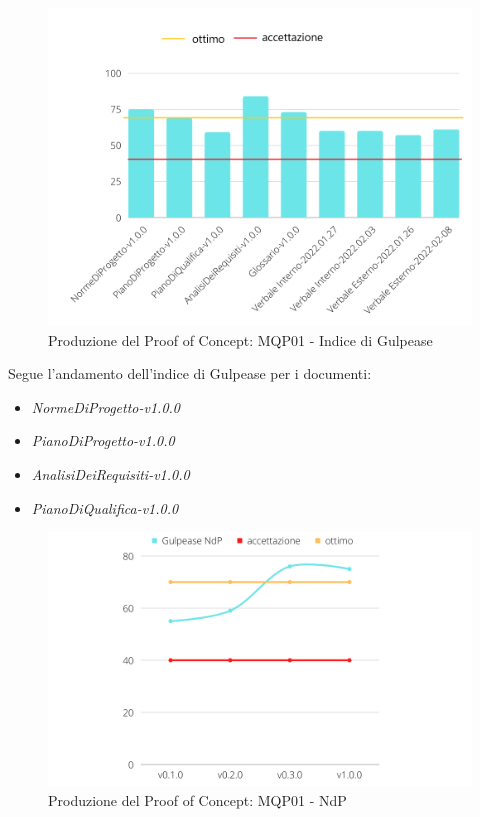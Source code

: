 \begin{figure}[H]
    \centering
    \includegraphics[scale=0.50]{Sezioni/images/poc-gulpease.png}
    \caption{Produzione del Proof of Concept: MQP01 - Indice di Gulpease}
\end{figure}

Segue l'andamento dell'indice di Gulpease per i documenti:
\begin{itemize}
    \item \textit{NormeDiProgetto-v1.0.0}
    \item \textit{PianoDiProgetto-v1.0.0}
    \item \textit{AnalisiDeiRequisiti-v1.0.0}
    \item \textit{PianoDiQualifica-v1.0.0}
\end{itemize}

\begin{figure}[H]
    \centering
    \includegraphics[scale=0.50]{Sezioni/images/poc-gulpease-ndp.png}
    \caption{Produzione del Proof of Concept: MQP01 - NdP}
\end{figure}


